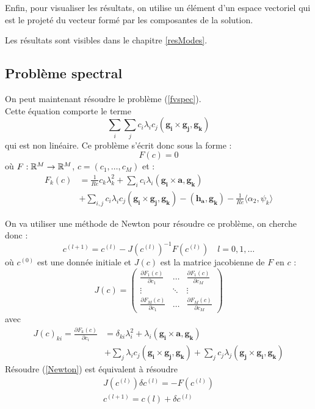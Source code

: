 

Enfin, pour visualiser les résultats, on utilise un élément d'un espace vectoriel qui est le projeté du vecteur formé par les composantes de la solution.



Les résultats sont visibles dans le chapitre \ref{resModes}.

\fi

\subsection{Problème spectral}

On peut maintenant résoudre le problème (\ref{fvspec}).\\
Cette équation comporte le terme
\[
\sum_i\sum_j c_i\lambda_i c_j(\mathbf{g_i}\times \mathbf{g_j}, \mathbf{g_k})
\]
qui est non linéaire. Ce problème s'écrit donc sous la forme :
\[
F(c) = 0
\]
où $F:{\mathbb{R}}^M\rightarrow{\mathbb{R}}^M$, $c=(c_1,\ldots, c_M)$ et :
\begin{align*}
F_k(c) &= \frac{1}{Re} c_k\lambda_k^2 + \sum_i c_i\lambda_i(\mathbf{g_i}\times \mathbf{a}, \mathbf{g_k})\\
&+ \sum_{i,j} c_i\lambda_i c_j (\mathbf{g_i}\times \mathbf{g_j}, \mathbf{g_k}) - (\mathbf{h_a},\mathbf{g_k}) - \frac{1}{Re}\langle \alpha_2, \psi_k \rangle
\end{align*}

On va utiliser une méthode de Newton pour résoudre ce problème, on cherche donc :
\begin{equation}
\label{Newton}
c^{(l+1)} = c^{(l)} - J(c^{(l)})^{-1}F(c^{(l)})\quad l=0,1,\ldots
\end{equation}
où $c^{(0)}$ est une donnée initiale et $J(c)$ est la matrice jacobienne de $F$ en $c$ :
\[
J(c)=
\begin{pmatrix}
\frac{\partial F_1(c)}{\partial c_1} & \ldots & \frac{\partial F_1(c)}{\partial c_M}\\
\vdots & \ddots & \vdots\\
\frac{\partial F_M(c)}{\partial c_1} & \ldots & \frac{\partial F_M(c)}{\partial c_M}
\end{pmatrix}
\]
avec 
\begin{align*}
J(c)_{ki} = \frac{\partial F_k(c)}{\partial c_i} &= \delta_{ki}\lambda_i^2 + \lambda_i(\mathbf{g_i}\times \mathbf{a},\mathbf{g_k})\\
&+ \sum_j\lambda_i c_j (\mathbf{g_i}\times\mathbf{g_j},\mathbf{g_k}) + \sum_j c_j\lambda_j (\mathbf{g_j}\times\mathbf{g_i},\mathbf{g_k})
\end{align*}
Résoudre (\ref{Newton}) est équivalent à résoudre 
\begin{equation}
\label{INewton}
\begin{aligned}
J(c^{(l)})\delta c^{(l)} = -F(c^{(l)})\\
c^{(l+1)}=c{(l)}+\delta c^{(l)}
\end{aligned}
\end{equation}

